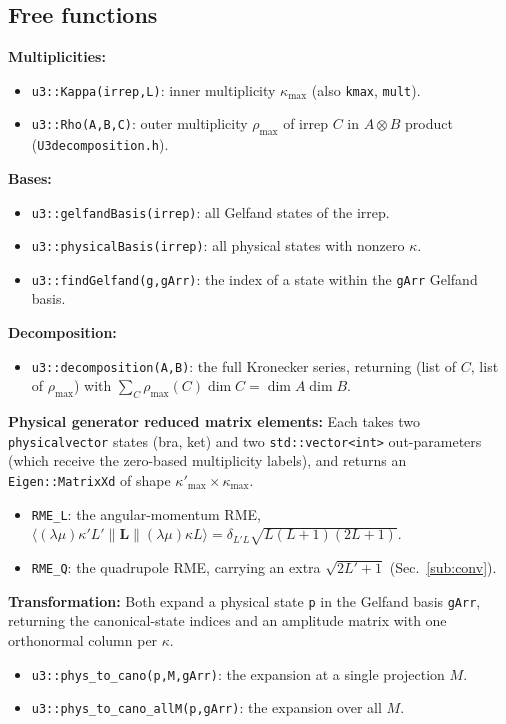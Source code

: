 \documentclass[aps,onecolumn,10pt,superscriptaddress,floatfix,nofootinbib]{revtex4}
\begin{document}
\subsection{Free functions}
\textbf{Multiplicities:}
\begin{itemize}
    \item \verb|u3::Kappa(irrep,L)|: inner multiplicity $\kappa_{\max}$ (also \verb|kmax|, \verb|mult|).
    \item \verb|u3::Rho(A,B,C)|: outer multiplicity $\rho_{\max}$ of irrep $C$ in $A\otimes B$ product (\verb|U3decomposition.h|).
\end{itemize}

\textbf{Bases:}
\begin{itemize}
    \item \verb|u3::gelfandBasis(irrep)|: all Gelfand states of the irrep.
    \item \verb|u3::physicalBasis(irrep)|: all physical states with nonzero $\kappa$.
    \item \verb|u3::findGelfand(g,gArr)|: the index of a state within the \verb|gArr| Gelfand basis.
\end{itemize}

\textbf{Decomposition:}
\begin{itemize}
    \item \verb|u3::decomposition(A,B)|: the full Kronecker series, returning (list of $C$, list of $\rho_{\max}$) with $\sum_C\rho_{\max}(C)\dim C=\dim A\dim B$.
\end{itemize}

\textbf{Physical generator reduced matrix elements:} Each takes two
\verb|physicalvector| states (bra, ket) and two \verb|std::vector<int>|
out-parameters (which receive the zero-based multiplicity labels), and returns an
\verb|Eigen::MatrixXd| of shape $\kappa'_{\max}\times\kappa_{\max}$.
\begin{itemize}
    \item \verb|RME_L|: the angular-momentum RME, $\langle(\lambda\mu)\kappa'L'\|\mathbf{L}\|(\lambda\mu)\kappa L\rangle=\delta_{L'L}\sqrt{L(L{+}1)(2L{+}1)}$.
    \item \verb|RME_Q|: the quadrupole RME, carrying an extra $\sqrt{2L'+1}$ (Sec.~\ref{sub:conv}).
\end{itemize}

\textbf{Transformation:} Both expand a physical state \verb|p|
in the Gelfand basis \verb|gArr|, returning the canonical-state indices and an amplitude matrix with one orthonormal
column per $\kappa$.
\begin{itemize}
    \item \verb|u3::phys_to_cano(p,M,gArr)|: the expansion at a single projection $M$.
    \item \verb|u3::phys_to_cano_allM(p,gArr)|: the expansion over all $M$.
\end{itemize}
\end{document}
